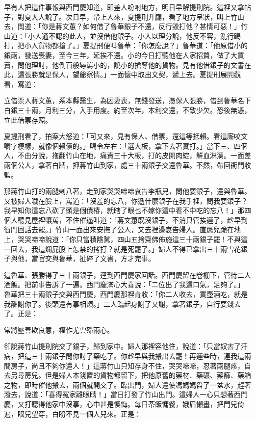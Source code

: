 早有人把這件事報與西門慶知道，即差人吩咐地方，明日早解提刑院。這裡又拿帖子，對夏大人說了。次日早，帶上人來，夏提刑升廳，看了地方呈狀，叫上竹山去，問道：「你是蔣文蕙？如何借了魯華銀子不還，反行毀打他？甚情可惡！」竹山道：「小人通不認的此人，並沒借他銀子。小人以理分說，他反不容，亂行踢打，把小人貨物都搶了。」夏提刑便叫魯華：「你怎麼說？」魯華道：「他原借小的銀兩，發送喪妻，至今三年，延挨不還。小的今日打聽他在人家招贅，做了大買賣，問他理討，他倒百般辱罵小的，說小的搶奪他的貨物。見有他借銀子的文書在此，這張勝就是保人，望爺察情。」一面懷中取出文契，遞上去。夏提刑展開觀看，寫道：

立借票人蔣文蕙，系本縣醫生，為因妻喪，無錢發送，憑保人張勝，借到魯華名下白銀三十兩，月利三分，入手用度。約至次年，本利交還，不致少欠。恐後無憑，立此借票存照。

夏提刑看了，拍案大怒道：「可又來，見有保人、借票，還這等抵賴。看這廝咬文嚼字模樣，就像個賴債的。」喝令左右：「選大板，拿下去著實打。」當下三、四個人，不由分說，拖翻竹山在地，痛責三十大板，打的皮開肉綻，鮮血淋漓。一面差兩個公人，拿著白牌，押蔣竹山到家，處三十兩銀子交還魯華。不然，帶回衙門收監。

那蔣竹山打的兩腿剌八著，走到家哭哭啼啼哀告李瓶兒，問他要銀子，還與魯華。又被婦人噦在臉上，罵道：「沒羞的忘八，你遞什麼銀子在我手裡，問我要銀子？我早知你這忘八砍了頭是個債椿，就瞎了眼也不嫁你這中看不中吃的忘八！」那四個人聽見屋裡嚷罵，不住催逼叫道：「蔣文蕙既沒銀子，不消只管挨遲了，趁早到衙門回話去罷。」竹山一面出來安撫了公人，又去裡邊哀告婦人。直蹶兒跪在地上，哭哭啼啼說道：「你只當積陰騭，四山五捨齋佛佈施這三十兩銀子罷！不與這一回去，我這爛屁股上怎禁的拷打？就是死罷了。」婦人不得已拿出三十兩雪花銀子與他，當官交與魯華，扯碎了文書，方才完事。

這魯華、張勝得了三十兩銀子，逕到西門慶家回話。西門慶留在卷棚下，管待二人酒飯。把前事告訴了一遍。西門慶滿心大喜說：「二位出了我這口氣，足夠了。」 魯華把三十兩銀子交與西門慶，西門慶那裡肯收：「你二人收去，買壺酒吃，就是我酬謝你了。後頭還有事相煩。」二人臨起身謝了又謝，拿著銀子，自行耍錢去了。正是：

常將壓善欺良意，權作尤雲殢雨心。

卻說蔣竹山提刑院交了銀子，歸到家中。婦人那裡容他住，說道：「只當奴害了汗病，把這三十兩銀子問你討了藥吃了。你趁早與我搬出去罷！再遲些時，連我這兩間房子，尚且不夠你還人！」這蔣竹山只知存身不住，哭哭啼啼，忍著兩腿疼，自去另尋房兒。但是婦人本錢置的貨物都留下，把他原舊的藥材、藥碾、藥篩、藥箱之物，即時催他搬去，兩個就開交了。臨出門，婦人還使馮媽媽舀了一盆水，趕著潑去，說道：「喜得冤家離眼睛！」當日打發了竹山出門。這婦人一心只想著西門慶，又打聽得他家中沒事，心中甚是懊悔。每日茶飯慵餐，娥眉懶畫，把門兒倚遍，眼兒望穿，白盼不見一個人兒來。正是：

